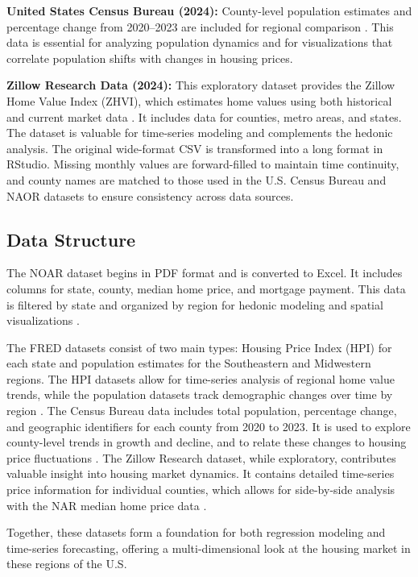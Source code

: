 \documentclass[journal,article,submit,pdftex,moreauthors]{Definitions/mdpi}
\begin{document}
\textbf{United States Census Bureau (2024):} County-level population estimates and percentage change from 2020–2023 are included for regional comparison \citep{_2023_county}. This data is essential for analyzing population dynamics and for visualizations that correlate population shifts with changes in housing prices.

\textbf{Zillow Research Data (2024):} This exploratory dataset provides the Zillow Home Value Index (ZHVI), which estimates home values using both historical and current market data \citep{zillow_2024_housing}. It includes data for counties, metro areas, and states. The dataset is valuable for time-series modeling and complements the hedonic analysis. The original wide-format CSV is transformed into a long format in RStudio. Missing monthly values are forward-filled to maintain time continuity, and county names are matched to those used in the U.S. Census Bureau and NAOR datasets to ensure consistency across data sources.

\subsection{Data Structure}

The NOAR dataset begins in PDF format and is converted to Excel. It includes columns for state, county, median home price, and mortgage payment. This data is filtered by state and organized by region for hedonic modeling and spatial visualizations \citep{_2024_county}.

The FRED datasets consist of two main types: Housing Price Index (HPI) for each state and population estimates for the Southeastern and Midwestern regions. The HPI datasets allow for time-series analysis of regional home value trends, while the population datasets track demographic changes over time by region \citep{a2024_hpi}. The Census Bureau data includes total population, percentage change, and geographic identifiers for each county from 2020 to 2023. It is used to explore county-level trends in growth and decline, and to relate these changes to housing price fluctuations \citep{_2023_county}. The Zillow Research dataset, while exploratory, contributes valuable insight into housing market dynamics. It contains detailed time-series price information for individual counties, which allows for side-by-side analysis with the NAR median home price data \citep{zillow_2024_housing}. 

Together, these datasets form a foundation for both regression modeling and time-series forecasting, offering a multi-dimensional look at the housing market in these regions of the U.S.
\end{document}
